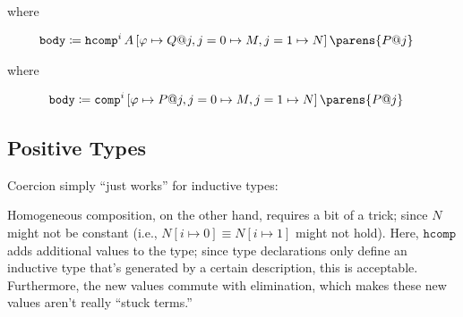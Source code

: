 \documentclass[11pt]{article}
\begin{document}
where

\begin{align*}
	\mathtt{body} & \defeq \mathtt{hcomp}^i\,A\,[\varphi\mapsto Q@j, j=0\mapsto M, j=1\mapsto N]\,\parens{P@j}
\end{align*}

\begin{prooftree*}
\end{prooftree*}

where

\begin{align*}
	\mathtt{body} & \defeq \mathtt{comp}^i\,[\varphi\mapsto P@j, j=0\mapsto M, j=1\mapsto N]\,\parens{P@j}
\end{align*}

\subsection{Positive Types}

Coercion simply ``just works'' for inductive types:

\begin{prooftree*}
\end{prooftree*}

Homogeneous composition, on the other hand, requires a bit of a trick; since $N$ might not be constant (i.e., $N[i\mapsto0]\equiv N[i\mapsto1]$ might not hold). Here, $\mathtt{hcomp}$ adds additional values to the type; since type declarations only define an inductive type that's generated by a certain description, this is acceptable. Furthermore, the new values commute with elimination, which makes these new values aren't really ``stuck terms.''

\printbibliography
\end{document}
